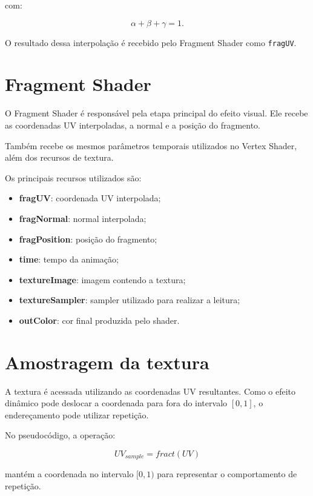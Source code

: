 com:

\begin{equation}
\alpha+\beta+\gamma=1.
\end{equation}

O resultado dessa interpolação é recebido pelo Fragment Shader como
\texttt{fragUV}.


\section{Fragment Shader}

O Fragment Shader é responsável pela etapa principal do efeito visual. Ele
recebe as coordenadas UV interpoladas, a normal e a posição do fragmento.

Também recebe os mesmos parâmetros temporais utilizados no Vertex Shader,
além dos recursos de textura.

Os principais recursos utilizados são:

\begin{itemize}
    \item \textbf{fragUV}: coordenada UV interpolada;
    \item \textbf{fragNormal}: normal interpolada;
    \item \textbf{fragPosition}: posição do fragmento;
    \item \textbf{time}: tempo da animação;
    \item \textbf{textureImage}: imagem contendo a textura;
    \item \textbf{textureSampler}: sampler utilizado para realizar a leitura;
    \item \textbf{outColor}: cor final produzida pelo shader.
\end{itemize}


\section{Amostragem da textura}

A textura é acessada utilizando as coordenadas UV resultantes. Como o efeito
dinâmico pode deslocar a coordenada para fora do intervalo $[0,1]$, o
endereçamento pode utilizar repetição.

No pseudocódigo, a operação:

\begin{equation}
UV_{sample}=fract(UV)
\end{equation}

mantém a coordenada no intervalo $[0,1)$ para representar o comportamento
de repetição.

